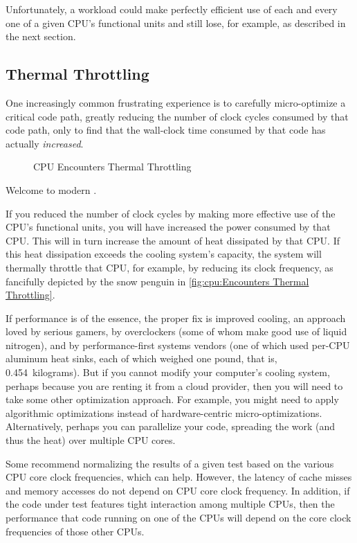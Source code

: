 Unfortunately, a workload could make perfectly efficient use of each and
every one of a given CPU's functional units and still lose, for example,
as described in the next section.

\subsection{Thermal Throttling}
\label{sec:cpu:Thermal Throttling}

One increasingly common frustrating experience is to carefully
micro-optimize a critical code path, greatly reducing the number of
clock cycles consumed by that code path, only to find that the
wall-clock time consumed by that code has actually \emph{increased}.

\begin{figure}
\centering
{}
\caption{CPU Encounters Thermal Throttling}
\end{figure}

Welcome to modern .

If you reduced the number of clock cycles by making more effective
use of the CPU's functional units, you will have increased the
power consumed by that CPU\@.
This will in turn increase the amount of heat dissipated by that CPU\@.
If this heat dissipation exceeds the cooling system's capacity, the
system will thermally throttle that CPU, for example, by reducing
its clock frequency, as fancifully depicted by the snow penguin in
\cref{fig:cpu:Encounters Thermal Throttling}.

If performance is of the essence, the proper fix is improved cooling,
an approach loved by serious gamers, by overclockers (some of whom make
good use of liquid nitrogen), and by performance-first systems vendors
(one of which used per-CPU aluminum heat sinks, each of which weighed
one pound, that is, 0.454~kilograms).
But if you cannot modify your computer's cooling system, perhaps because
you are renting it from a cloud provider, then you will need to take
some other optimization approach.
For example, you might need to apply algorithmic optimizations instead
of hardware-centric micro-optimizations.
Alternatively, perhaps you can parallelize your code, spreading the
work (and thus the heat) over multiple CPU cores.

Some recommend normalizing the results of a given test based on
the various CPU core clock frequencies, which can help.
However, the latency of cache misses and memory accesses do not
depend on CPU core clock frequency.
In addition, if the code under test features tight interaction among
multiple CPUs, then the performance that code running on one of the CPUs
will depend on the core clock frequencies of those other CPUs.

